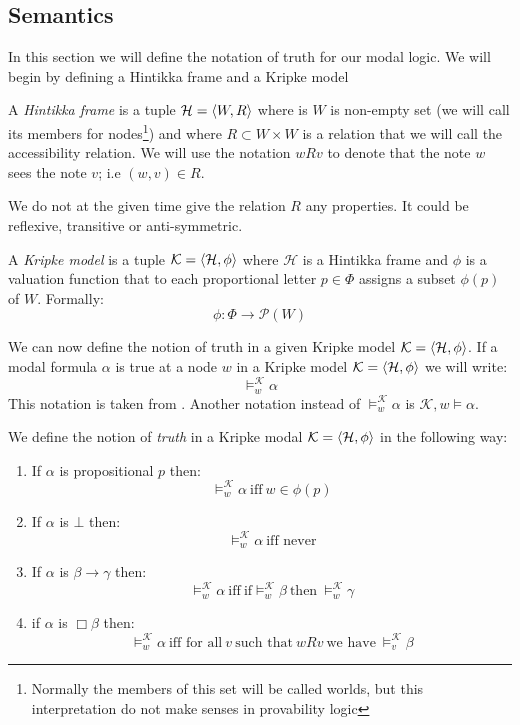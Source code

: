 \documentclass[../main.tex]{subfiles}
\begin{document}
\subsection{Semantics}
In this section we will define the notation of truth for our modal logic. We
will begin by defining a Hintikka frame and a Kripke model
\begin{defi}
	A \textit{Hintikka frame} is a tuple $\mathcal{H}=\langle W,R\rangle$ where is $W$ is
	non-empty set (we will call its members for nodes\footnote{Normally
		the members of this set will be called worlds, but this
	interpretation do not make senses in provability logic}) and where $R\subset
	W\times W$ is a relation that we will call the accessibility relation.
	We will use the notation $wRv$ to denote that the note $w$ sees the note
	$v$; i.e $(w,v)\in R$.
\end{defi}
We do not at the given time give the relation $R$ any properties. It could be
reflexive, transitive or anti-symmetric.
\begin{defi}
	A \textit{Kripke model} is a tuple $\mathcal{K}=\langle \mathcal{H},\phi\rangle$ where
	$\mathcal{H}$ is a Hintikka frame and $\phi$ is a valuation function that to
	each proportional letter $p\in \Phi$ assigns a subset $\phi(p)$ of $W$.
	Formally:
	\[\phi:\Phi\rightarrow\mathcal{P}(W)\]
\end{defi}
We can now define the notion of truth in a given Kripke model $\mathcal{K}=\langle
\mathcal{H},\phi\rangle$. If a modal formula $\alpha$ is true at a node $w$ in a
Kripke model $\mathcal{K}=\langle \mathcal{H},\phi\rangle$ we will write:
\[\vDash_w^\mathcal{K}\alpha\]
This notation is taken from \parencite{Lemmon1977}. Another notation instead of
$\vDash^\mathcal{K}_w\alpha$ is $\mathcal{K},w\vDash\alpha$.
\begin{defi}
	We define the notion of \textit{truth} in a Kripke modal $\mathcal{K}=\langle
	\mathcal{H},\phi\rangle$ in the
	following way:
	\begin{enumerate}
		\item If $\alpha$ is propositional $p$ then:
			\[\vDash_w^\mathcal{K}\alpha\ \text{iff}\ w\in\phi(p)\]
		\item If $\alpha$ is $\bot$ then:
			\[\vDash_w^\mathcal{K}\alpha\ \text{iff never} \]
		\item If $\alpha$ is $\beta\rightarrow\gamma$ then:
			\[\vDash_w^\mathcal{K}\alpha\ \text{iff}\ \text{if}
				\vDash_w^\mathcal{K}\beta\ \text{then}\
			\vDash_w^\mathcal{K}\gamma\]
		\item if $\alpha$ is $\Box\beta$ then:
			\[\vDash_w^\mathcal{K}\alpha\ \text{iff for all}\ v\
				\text{such that}\ wRv\ \text{we have}\
			\vDash_v^\mathcal{K}\beta\]
	\end{enumerate}
\end{defi}
\end{document}
